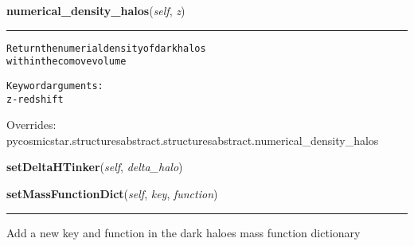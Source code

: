     \vspace{0.5ex}

\hspace{.8\funcindent}\begin{boxedminipage}{\funcwidth}

    \raggedright \textbf{numerical\_density\_halos}(\textit{self}, \textit{z})

    \vspace{-1.5ex}

    \rule{\textwidth}{0.5\fboxrule}
\setlength{\parskip}{2ex}
\begin{alltt}
Return the numerial density of dark halos
within the comove volume

Keyword arguments:
    z- redshift
\end{alltt}

\setlength{\parskip}{1ex}
      Overrides: pycosmicstar.structuresabstract.structuresabstract.numerical\_density\_halos

    \end{boxedminipage}

    \label{pycosmicstar:structures:structures:setDeltaHTinker}

    \vspace{0.5ex}

\hspace{.8\funcindent}\begin{boxedminipage}{\funcwidth}

    \raggedright \textbf{setDeltaHTinker}(\textit{self}, \textit{delta\_halo})

\setlength{\parskip}{2ex}
\setlength{\parskip}{1ex}
    \end{boxedminipage}

    \label{pycosmicstar:structures:structures:setMassFunctionDict}

    \vspace{0.5ex}

\hspace{.8\funcindent}\begin{boxedminipage}{\funcwidth}

    \raggedright \textbf{setMassFunctionDict}(\textit{self}, \textit{key}, \textit{function})

    \vspace{-1.5ex}

    \rule{\textwidth}{0.5\fboxrule}
\setlength{\parskip}{2ex}
    Add a new key and function in the dark haloes mass function dictionary

\setlength{\parskip}{1ex}
    \end{boxedminipage}

